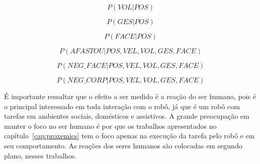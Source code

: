 \begin{equation}
	\label{eq:3}
	P(VOL|POS)
\end{equation}

\begin{equation}
	\label{eq:4}
	P(GES|POS)
\end{equation}

\begin{equation}
	\label{eq:5}
	P(FACE|POS)
\end{equation}

\begin{equation}
	\label{eq:6}
	P(AFASTOU|POS, VEL, VOL, GES, FACE)
\end{equation}

\begin{equation}
	\label{eq:7}
	P(NEG\_FACE|POS, VEL, VOL, GES, FACE)
\end{equation}

\begin{equation}
	\label{eq:8}
	P(NEG\_CORP|POS, VEL, VOL, GES, FACE)
\end{equation}

É importante ressaltar que o efeito a ser medido é a reação do ser humano, pois é o principal interessado em toda interação com o robô, já que é um robô com tarefas em ambientes sociais, domésticos e assistivos. A grande preocupação em manter o foco no ser humano é por que os trabalhos apresentados no capítulo~\ref{cap:proxemics} tem o foco apenas na execução da tarefa pelo robô e em seu comportamento. As reações dos seres humanos são colocadas em segundo plano, nesses trabalhos.
